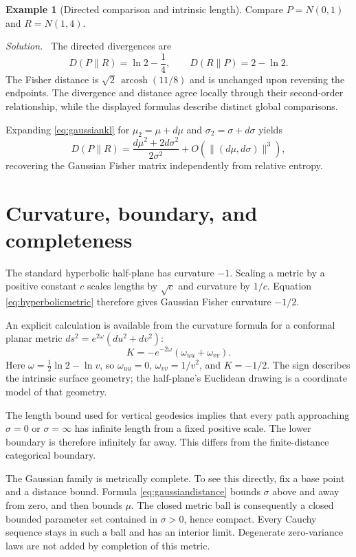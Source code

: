 \documentclass[11pt,oneside,openany]{book}
\theoremstyle{definition}
\newtheorem{example}{Example}[chapter]
\theoremstyle{remark}
\newenvironment{solution}{\par\smallskip\noindent\textit{Solution.}\ }{\par\smallskip}
\newcommand{\arcosh}{\operatorname{arcosh}}
\numberwithin{equation}{chapter}
\begin{document}
\begin{example}[Directed comparison and intrinsic length]
Compare $P=N(0,1)$ and $R=N(1,4)$.
\begin{solution}
The directed divergences are
\[
D(P\|R)=\ln2-\frac14,\qquad
D(R\|P)=2-\ln2.
\]
The Fisher distance is $\sqrt2\,\arcosh(11/8)$ and is unchanged upon reversing the endpoints. The divergence and distance agree locally through their second-order relationship, while the displayed formulas describe distinct global comparisons.
\end{solution}
\end{example}

Expanding \eqref{eq:gaussiankl} for $\mu_2=\mu+d\mu$ and $\sigma_2=\sigma+d\sigma$ yields
\[
D(P\|R)=\frac{d\mu^2+2d\sigma^2}{2\sigma^2}
+O(\|(d\mu,d\sigma)\|^3),
\]
recovering the Gaussian Fisher matrix independently from relative entropy.

\section{Curvature, boundary, and completeness}
The standard hyperbolic half-plane has curvature $-1$. Scaling a metric by a positive constant $c$ scales lengths by $\sqrt c$ and curvature by $1/c$. Equation \eqref{eq:hyperbolicmetric} therefore gives Gaussian Fisher curvature $-1/2$.

An explicit calculation is available from the curvature formula for a conformal planar metric $ds^2=e^{2\omega}(du^2+dv^2)$:
\[
K=-e^{-2\omega}(\omega_{uu}+\omega_{vv}).
\]
Here $\omega=\tfrac12\ln2-\ln v$, so $\omega_{uu}=0$, $\omega_{vv}=1/v^2$, and $K=-1/2$. The sign describes the intrinsic surface geometry; the half-plane's Euclidean drawing is a coordinate model of that geometry.

The length bound used for vertical geodesics implies that every path approaching $\sigma=0$ or $\sigma=\infty$ has infinite length from a fixed positive scale. The lower boundary is therefore infinitely far away. This differs from the finite-distance categorical boundary.

The Gaussian family is metrically complete. To see this directly, fix a base point and a distance bound. Formula \eqref{eq:gaussiandistance} bounds $\sigma$ above and away from zero, and then bounds $\mu$. The closed metric ball is consequently a closed bounded parameter set contained in $\sigma>0$, hence compact. Every Cauchy sequence stays in such a ball and has an interior limit. Degenerate zero-variance laws are not added by completion of this metric.
\end{document}
